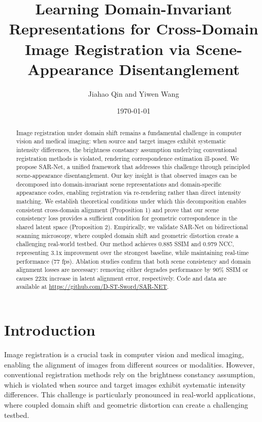 \documentclass{article}
\begin{document}
        \title{Learning Domain-Invariant Representations for Cross-Domain Image Registration via Scene-Appearance Disentanglement}
        \author{Jiahao Qin and Yiwen Wang}
        \date{\today}
        \maketitle

        \begin{abstract}
        Image registration under domain shift remains a fundamental challenge in computer vision and medical imaging: when source and target images exhibit systematic intensity differences, the brightness constancy assumption underlying conventional registration methods is violated, rendering correspondence estimation ill-posed. We propose SAR-Net, a unified framework that addresses this challenge through principled scene-appearance disentanglement. Our key insight is that observed images can be decomposed into domain-invariant scene representations and domain-specific appearance codes, enabling registration via re-rendering rather than direct intensity matching. We establish theoretical conditions under which this decomposition enables consistent cross-domain alignment (Proposition 1) and prove that our scene consistency loss provides a sufficient condition for geometric correspondence in the shared latent space (Proposition 2). Empirically, we validate SAR-Net on bidirectional scanning microscopy, where coupled domain shift and geometric distortion create a challenging real-world testbed. Our method achieves 0.885 SSIM and 0.979 NCC, representing 3.1x improvement over the strongest baseline, while maintaining real-time performance (77 fps). Ablation studies confirm that both scene consistency and domain alignment losses are necessary: removing either degrades performance by 90\% SSIM or causes 223x increase in latent alignment error, respectively. Code and data are available at \url{https://github.com/D-ST-Sword/SAR-NET}.
        \end{abstract}

        \section{Introduction}
        Image registration is a crucial task in computer vision and medical imaging, enabling the alignment of images from different sources or modalities. However, conventional registration methods rely on the brightness constancy assumption, which is violated when source and target images exhibit systematic intensity differences. This challenge is particularly pronounced in real-world applications, where coupled domain shift and geometric distortion can create a challenging testbed.
\end{document}
